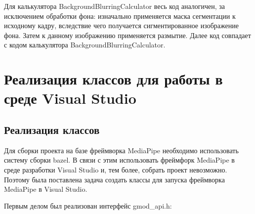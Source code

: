 \documentclass[a4paper,14pt]{extreport}
\begin{document}
        Для калькулятора BackgroundBlurringCalculator весь код аналогичен, за исключением обработки фона: изначально применяется маска сегментации к исходному кадру, вследствие чего получается сигментированное изображение фона. Затем к данному изображению применяется размытие. Далее код совпадает с кодом калькулятора BackgroundBlurringCalculator. 
    
    \chapter{Реализация классов для работы в среде Visual Studio}
        \section{Реализация классов}
        Для сборки проекта на базе фреймворка MediaPipe необходимо использовать систему сборки bazel. В связи с этим использовать фреймфорк MediaPipe в среде разработки Visual Studio и, тем более, собрать проект невозможно. Поэтому была поставлена задача создать классы для запуска фреймворка MediaPipe в Visual Studio.
    
        Первым делом был реализован интерфейс gmod\_api.h:
        
    
\end{document}
